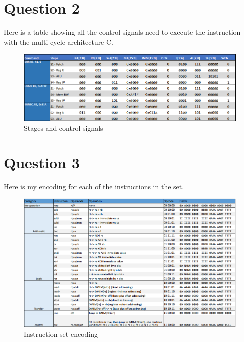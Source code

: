 \documentclass[11pt]{article}
\begin{document}
                
\section{Question 2}
    	
        Here is a table showing all the control signals need to execute the instruction with the multi-cycle architecture C.
    
        \begin{figure}[ht]
          \centering
          \includegraphics[width=1\textwidth]{tables/Q2ControlSignals}
          \caption{Stages and control signals}
        \end{figure}
        
        
	\section{Question 3}
    
    Here is my encoding for each of the instructions in the set.
    
    \begin{figure}[ht]
      \centering
      \includegraphics[width=1\textwidth]{tables/InstructionSet}
      \caption{Instruction set encoding}
    \end{figure}

	
	\newpage
	\printbibliography
	\newpage
	
    
    
    
            
         
    
    
\end{document}
